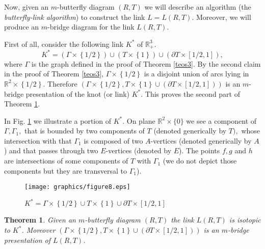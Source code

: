 \documentclass{amsproc}\usepackage{eurosym}
\theoremstyle{plain}
\newtheorem{theorem}{Theorem}
\numberwithin{equation}{section}
\begin{document}
Now, given an $m$-butterfly diagram $\left(  R,T\right)  $ we will describe an
algorithm (the \textit{butterfly-link algorithm}) to construct the link
$L=L(R,T)$. Moreover, we will produce an $m$-bridge diagram for the link
$L\left(  R,T\right)  $.

First of all, consider the following link $K^{\ast}$ of $\mathbb{R}_{+}^{3}$.
\[
K^{\ast}=\left(  \Gamma\times\left\{  1/2\right\}  \right)  \cup\left(
T\times\left\{  1\right\}  \right)  \cup\left(  \partial T\times\left[
1/2,1\right]  \right)  ,
\]
where $\Gamma$ is the graph defined in the proof of Theorem \ref{teos3}. By
the second claim in the proof of Theorem \ref{teos3}, $\Gamma\times\left\{
1/2\right\}  $ is a disjoint union of arcs lying in $\mathbb{R}^{2}\times\left\{  1/2\right\}  .$ Therefore $(\Gamma\times\left\{  1/2\right\}
,T\times\left\{  1\right\}  \cup\left(  \partial T\times\left[  1/2,1\right]
\right)  )$ is an $m$-bridge presentation of the knot (or link) $K^{\ast}$.
This proves the second part of Theorem \ref{teobridge}.

In Fig. \ref{fig3} we illustrate a portion of $K^{\ast}.$ On plane
$\mathbb{R}^{2}\times\{0\}$ we see a component of $\Gamma,\Gamma_{1},$ that is
bounded by two components of $T$ (denoted generically by $T),$ whose
intersection with that $\Gamma_{1}$ is composed of two $A$-vertices (denoted
generically by $A$) and that passes through two $E$-vertices (denoted by $E$).
The points $f,g$ and $h$ are intersections of some components of $T$ with
$\Gamma_{1}$ (we do not depict those components but they are transversal to
$\Gamma_{1}$)$.$
\begin{figure}
[h]
\begin{center}
\texttt{[image: graphics/figure8.eps]}\caption{$K^{\ast}=\Gamma\times\left\{  1/2\right\}  \cup T\times\left\{
1\right\}  \cup\partial T\times\left[  1/2,1\right]  $}
\label{fig3}
\end{center}
\end{figure}



\begin{theorem}
\label{teobridge} Given an $m$-butterfly diagram $(R,T)$ the link $L(R,T)$ is
isotopic to $K^{\ast}$. Moreover $(\Gamma\times\left\{  1/2\right\}
,T\times\left\{  1\right\}  \cup\left(  \partial T\times\left[  1/2,1\right]
\right)  )$ is an $m$-bridge presentation of $L(R,T)$.
\end{theorem}
\end{document}

